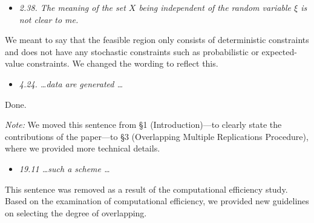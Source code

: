 \documentclass[11pt,notitlepage,onecolumn]{article}
\newcommand{\noi}{\noindent}
\begin{document}
\bigskip 


\noi {\bf \large Minor comments:}
\medskip 



\begin{itemize}
\item[] \textit{2.38. The meaning of the set $X$ being independent of the random variable $\xi$ is not clear to me.}
\end{itemize}

\noi 
We meant to say that the feasible region only consists of deterministic constraints and does not have any stochastic constraints such as probabilistic or expected-value constraints. 
We changed the wording to reflect this. 
\medskip 


\begin{itemize}
\item[] \textit{4.24. \ldots data are generated \ldots}
\end{itemize}

\noi 
Done.
\medskip

\noi
{\it Note:}
We moved this sentence from \S 1 (Introduction)---to clearly state the contributions of the paper---to \S 3 (Overlapping Multiple Replications Procedure), where we provided more technical details. 
\medskip 

\begin{itemize}
\item[] \textit{19.11 \ldots such a scheme \ldots}
\end{itemize}

\noi
This sentence was removed as a result of the computational efficiency study. 
Based on the examination of computational efficiency, we provided new guidelines on selecting the degree of overlapping. 
\end{document}
